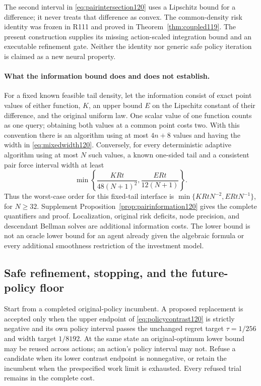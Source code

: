 The second interval in \eqref{eq:pairintersection120} uses a Lipschitz
bound for a difference; it never treats that difference as convex.
The common-density risk identity was frozen in R111 and proved in
Theorem~\ref{thm:coupled119}.  The present construction supplies its
missing action-scaled integration bound and an executable refinement
gate.  Neither the identity nor generic safe policy iteration is claimed
as a new neural property.

\paragraph{What the information bound does and does not establish.}
For a fixed known feasible tail density, let the information consist of
exact point values of either function, $K$, an upper bound $E$ on the
Lipschitz constant of their difference, and the original uniform law.
One scalar value of one function counts as one query; obtaining both
values at a common point costs two.  With this convention there is an
algorithm using at most $4n+8$ values and having the width in
\eqref{eq:mixedwidth120}.  Conversely, for every deterministic adaptive
algorithm using at most $N$ such values, a known one-sided tail and a
consistent pair force interval width at least
\begin{equation}\label{eq:pairlower120}
 \min\left\{\frac{KRt}{48(N+1)^2},
                    \frac{ERt}{12(N+1)}\right\}.
\end{equation}
Thus the worst-case order for this fixed-tail interface is
$\min\{KRtN^{-2},ERtN^{-1}\}$, for $N\ge32$.
Supplement Proposition~\ref{prop:pairinformation120} gives the complete
quantifiers and proof.  Localization, original risk deficits, node
precision, and descendant Bellman solves are additional information
costs.  The lower bound is not an oracle lower bound for an agent already
given the algebraic formula or every additional smoothness restriction
of the investment model.

\subsection{Safe refinement, stopping, and the future-policy floor}
Start from a completed original-policy incumbent.  A proposed replacement
is accepted only when the upper endpoint of
\eqref{eq:policycontrast120} is strictly negative and its own policy
interval passes the unchanged regret target $\tau=1/256$ and width
target $1/8192$.  At the same state an original-optimum lower bound
may be reused across actions; an action's policy interval may not.
Refuse a candidate when its lower contrast endpoint is nonnegative,
or retain the incumbent when the prespecified work limit is exhausted.
Every refused trial remains in the complete cost.

